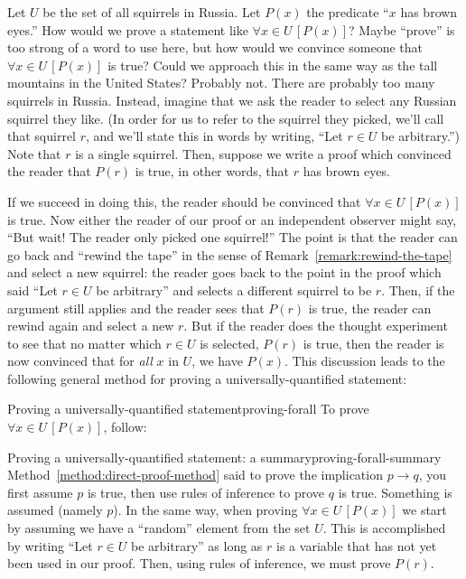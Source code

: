 \documentclass{book}
\theoremstyle{ekimcustom}
\begin{document}
Let $U$ be the set of all squirrels in Russia. Let $P(x)$ the predicate ``$x$ has brown eyes.'' How would we prove a statement like $\forall x \in U\,[P(x)]$? Maybe ``prove'' is too strong of a word to use here, but how would we convince someone that $\forall x \in U\,[P(x)]$ is true? Could we approach this in the same way as the tall mountains in the United States? Probably not. There are probably too many squirrels in Russia. Instead, imagine that we ask the reader to select any Russian squirrel they like. (In order for us to refer to the squirrel they picked, we'll call that squirrel $r$, and we'll state this in words by writing, ``Let $r \in U$ be arbitrary.'') Note that $r$ is a single squirrel. Then, suppose we write a proof which convinced the reader that $P(r)$ is true, in other words, that $r$ has brown eyes.

If we succeed in doing this, the reader should be convinced that $\forall x \in U\,[P(x)]$ is true. Now either the reader of our proof or an independent observer might say, ``But wait! The reader only picked one squirrel!'' The point is that the reader can go back and ``rewind the tape'' in the sense of Remark~\ref{remark:rewind-the-tape} and select a new squirrel: the reader goes back to the point in the proof which said ``Let $r \in U$ be arbitrary'' and selects a different squirrel to be $r$. Then, if the argument still applies and the reader sees that $P(r)$ is true, the reader can rewind again and select a new $r$. But if the reader does the thought experiment to see that no matter which $r \in U$ is selected, $P(r)$ is true, then the reader is now convinced that for \emph{all} $x$ in $U$, we have $P(x)$. This discussion leads to the following general method for proving a universally-quantified statement:
\begin{bmethod}{Proving a universally-quantified statement}{proving-forall}
To prove $\forall x \in U\,[P(x)]$, follow:
\begin{center}
\end{center}
\end{bmethod}

\begin{bmethod}{Proving a universally-quantified statement: a summary}{proving-forall-summary}
Method~\ref{method:direct-proof-method} said to prove the implication $p \rightarrow q$, you first assume $p$ is true, then use rules of inference to prove $q$ is true. Something is assumed (namely $p$).
\vskip6pt
In the same way, when proving $\forall x \in U\,[P(x)]$ we start by assuming we have a ``random'' element from the set $U$. This is accomplished by writing ``Let $r \in U$ be arbitrary'' as long as $r$ is a variable that has not yet been used in our proof. Then, using rules of inference, we must prove $P(r)$.
\end{bmethod}
\end{document}
